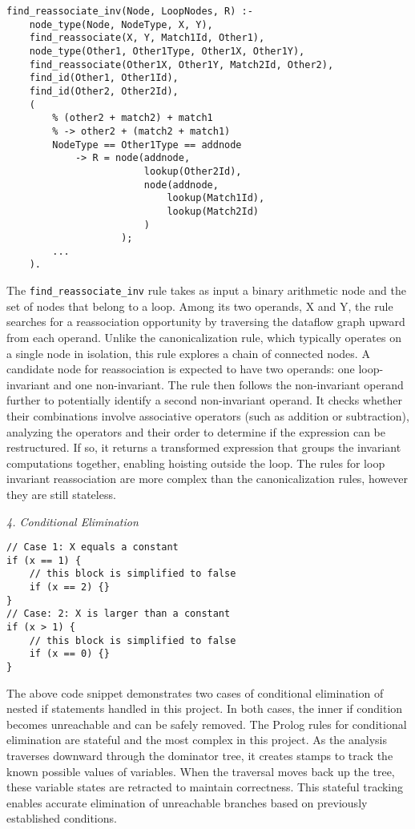 \begin{lstlisting}
find_reassociate_inv(Node, LoopNodes, R) :-
    node_type(Node, NodeType, X, Y),
    find_reassociate(X, Y, Match1Id, Other1),
    node_type(Other1, Other1Type, Other1X, Other1Y),
    find_reassociate(Other1X, Other1Y, Match2Id, Other2),
    find_id(Other1, Other1Id),
    find_id(Other2, Other2Id),
    (
        % (other2 + match2) + match1 
        % -> other2 + (match2 + match1)
        NodeType == Other1Type == addnode
            -> R = node(addnode, 
                        lookup(Other2Id), 
                        node(addnode, 
                            lookup(Match1Id), 
                            lookup(Match2Id)
                        )
                    );
        ...
    ).
\end{lstlisting}
The \texttt{find_reassociate_inv} rule takes as input a binary arithmetic node and the set of nodes that belong to a loop.
Among its two operands, X and Y, the rule searches for a reassociation opportunity by traversing the dataflow graph upward from each operand. 
Unlike the canonicalization rule, which typically operates on a single node in isolation, this rule explores a chain of connected nodes. 
A candidate node for reassociation is expected to have two operands: one loop-invariant and one non-invariant. 
The rule then follows the non-invariant operand further to potentially identify a second non-invariant operand. 
It checks whether their combinations involve associative operators (such as addition or subtraction), analyzing the operators and their order to determine if the expression can be restructured. If so, it returns a transformed expression that groups the invariant computations together, enabling hoisting outside the loop.
The rules for loop invariant reassociation are more complex than the canonicalization rules, however they are still stateless.

\bigbreak
\textit{4. Conditional Elimination}
\smallbreak

\begin{lstlisting}
// Case 1: X equals a constant
if (x == 1) {
    // this block is simplified to false
    if (x == 2) {}
}
// Case: 2: X is larger than a constant
if (x > 1) {
    // this block is simplified to false
    if (x == 0) {}
}
\end{lstlisting}

The above code snippet demonstrates two cases of conditional elimination of nested if statements handled in this project. In both cases, the inner if condition becomes unreachable and can be safely removed.
The Prolog rules for conditional elimination are stateful and the most complex in this project. As the analysis traverses downward through the dominator tree, it creates stamps to track the known possible values of variables. When the traversal moves back up the tree, these variable states are retracted to maintain correctness. This stateful tracking enables accurate elimination of unreachable branches based on previously established conditions.

